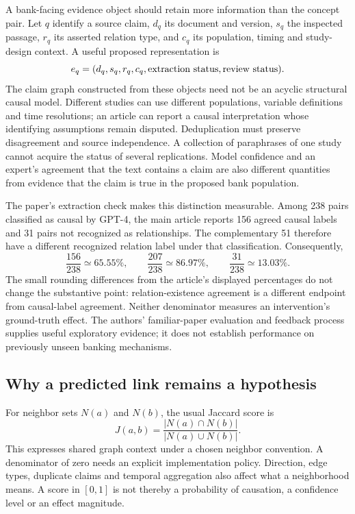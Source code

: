 A bank-facing evidence object should retain more information than the concept pair. Let $q$ identify a source claim, $d_q$ its document and version, $s_q$ the inspected passage, $r_q$ its asserted relation type, and $c_q$ its population, timing and study-design context. A useful proposed representation is
\begin{equation}
  e_q=(d_q,s_q,r_q,c_q,\hbox{extraction status},\hbox{review status}).
  \label{exec20:hypothesis-evidence}
\end{equation}
The claim graph constructed from these objects need not be an acyclic structural causal model. Different studies can use different populations, variable definitions and time resolutions; an article can report a causal interpretation whose identifying assumptions remain disputed. Deduplication must preserve disagreement and source independence. A collection of paraphrases of one study cannot acquire the status of several replications. Model confidence and an expert's agreement that the text contains a claim are also different quantities from evidence that the claim is true in the proposed bank population.

The paper's extraction check makes this distinction measurable. Among 238 pairs classified as causal by GPT-4, the main article reports 156 agreed causal labels and 31 pairs not recognized as relationships. The complementary 51 therefore have a different recognized relation label under that classification. Consequently,
\begin{equation}
 \frac{156}{238}\simeq 65.55\%,\qquad
 \frac{207}{238}\simeq 86.97\%,\qquad
 \frac{31}{238}\simeq 13.03\%.
 \label{exec20:hypothesis-denominators}
\end{equation}
The small rounding differences from the article's displayed percentages do not change the substantive point: relation-existence agreement is a different endpoint from causal-label agreement. Neither denominator measures an intervention's ground-truth effect. The authors' familiar-paper evaluation and feedback process supplies useful exploratory evidence; it does not establish performance on previously unseen banking mechanisms.~\citep{exec20_hypothesis_generation,exec20_hypothesis_reference}

\subsection{Why a predicted link remains a hypothesis}
\label{exec20:hypothesis-graph}
For neighbor sets $N(a)$ and $N(b)$, the usual Jaccard score is
\begin{equation}
 J(a,b)=\frac{|N(a)\cap N(b)|}{|N(a)\cup N(b)|}.
 \label{exec20:hypothesis-jaccard}
\end{equation}
This expresses shared graph context under a chosen neighbor convention. A denominator of zero needs an explicit implementation policy. Direction, edge types, duplicate claims and temporal aggregation also affect what a neighborhood means. A score in $[0,1]$ is not thereby a probability of causation, a confidence level or an effect magnitude.

